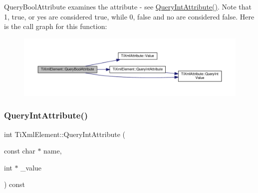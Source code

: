 Query\+Bool\+Attribute examines the attribute -\/ see \hyperlink{classTiXmlElement_a5c0f739e0f6f5905a201364532e54a60}{Query\+Int\+Attribute()}. Note that \textquotesingle{}1\textquotesingle{}, \textquotesingle{}true\textquotesingle{}, or \textquotesingle{}yes\textquotesingle{} are considered true, while \textquotesingle{}0\textquotesingle{}, \textquotesingle{}false\textquotesingle{} and \textquotesingle{}no\textquotesingle{} are considered false. Here is the call graph for this function\+:
\nopagebreak
\begin{figure}[H]
\begin{center}
\leavevmode
\includegraphics[width=350pt]{classTiXmlElement_a5789b1488af75b6ae37a749700495ceb_cgraph}
\end{center}
\end{figure}
\mbox{\label{classTiXmlElement_a5c0f739e0f6f5905a201364532e54a60}} 
\subsubsection{\texorpdfstring{Query\+Int\+Attribute()}{QueryIntAttribute()}}
{\footnotesize\ttfamily int Ti\+Xml\+Element\+::\+Query\+Int\+Attribute (\begin{DoxyParamCaption}\item[{const char $\ast$}]{name,  }\item[{int $\ast$}]{\+\_\+value }\end{DoxyParamCaption}) const}

